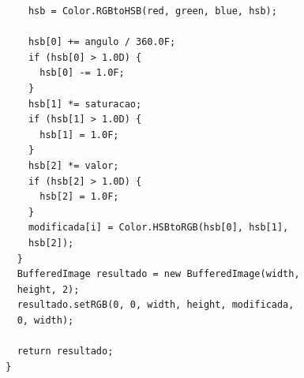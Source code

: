 \documentclass[	12pt, Times, openright, twoside, a4paper, english, brazil]{abntex2}
\begin{document}
\begin{apendicesenv}
\begin{lstlisting}
      hsb = Color.RGBtoHSB(red, green, blue, hsb);
      
      hsb[0] += angulo / 360.0F;
      if (hsb[0] > 1.0D) {
        hsb[0] -= 1.0F;
      }
      hsb[1] *= saturacao;
      if (hsb[1] > 1.0D) {
        hsb[1] = 1.0F;
      }
      hsb[2] *= valor;
      if (hsb[2] > 1.0D) {
        hsb[2] = 1.0F;
      }
      modificada[i] = Color.HSBtoRGB(hsb[0], hsb[1], 
      hsb[2]);
    }
    BufferedImage resultado = new BufferedImage(width, 
    height, 2);
    resultado.setRGB(0, 0, width, height, modificada, 
    0, width);
    
    return resultado;
  }
\end{lstlisting}

\end{apendicesenv}
\end{document}
